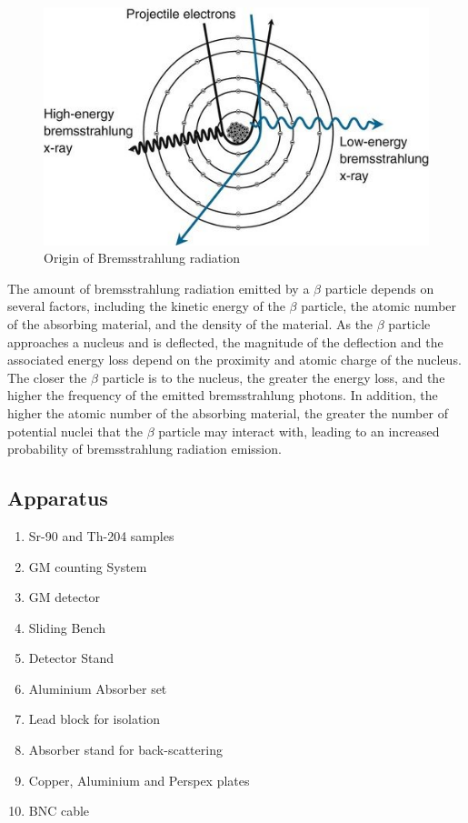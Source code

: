 \begin{figure}
    \centering
    \includegraphics[width=1\columnwidth]{images/brem.jpg}
    \caption{Origin of Bremsstrahlung radiation}
    \label{g1}
\end{figure}

The amount of bremsstrahlung radiation emitted by a $\beta$ particle depends on several factors, including the kinetic energy of the $\beta$ particle, the atomic number of the absorbing material, and the density of the material. As the $\beta$ particle approaches a nucleus and is deflected, the magnitude of the deflection and the associated energy loss depend on the proximity and atomic charge of the nucleus. The closer the $\beta$ particle is to the nucleus, the greater the energy loss, and the higher the frequency of the emitted bremsstrahlung photons. In addition, the higher the atomic number of the absorbing material, the greater the number of potential nuclei that the $\beta$ particle may interact with, leading to an increased probability of bremsstrahlung radiation emission.


\subsection*{Apparatus}

\begin{enumerate}
    \item Sr-90 and Th-204 samples
    \item GM counting System
    \item GM detector
    \item Sliding Bench
    \item Detector Stand
    \item Aluminium Absorber set
    \item Lead block for isolation
    \item Absorber stand for back-scattering
    \item Copper, Aluminium and Perspex plates
    \item BNC cable\\
\end{enumerate}

